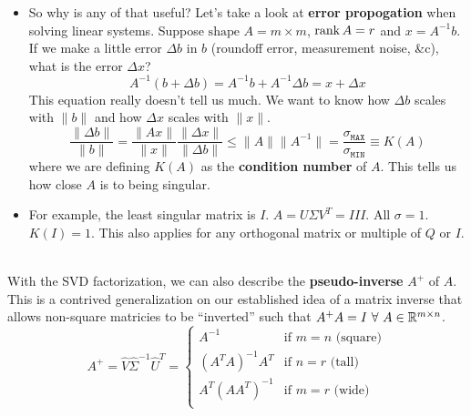 \documentclass[11pt]{article}
\begin{document}
\begin{itemize}
	\item So why is any of that useful? Let's take a look at \textbf{error propogation} when solving linear systems. Suppose $\text{shape } A = m \times m$, $\rank A = r$ and $x = A^{-1}b.$ If we make a little error $\Delta b$ in $b$ (roundoff error, measurement noise, &c), what is the error $\Delta x$? 
		$$A^{-1}(b + \Delta b) = A^{-1}b + A^{-1}\Delta b = x + \Delta x$$
This equation really doesn't tell us much. We want to know how $\Delta b$ scales with $\|b\|$ and how $\Delta x$ scales with $\| x\|$.
$$\frac{\| \Delta b \|}{\| b \|} = \frac{\| Ax \|}{\| x \|} \frac{\| \Delta x\|}{\|\Delta b\|} \leq \| A \| \| A^{-1}\| = \frac{\sigma_{\texttt{MAX}}}{\sigma_{\texttt{MIN}}} \equiv K(A)$$
where we are defining $K(A)$ as the \textbf{condition number} of $A$. This tells us how close $A$ is to being singular.
	\item For example, the least singular matrix is $I$. $A = U \Sigma V^T = I I I $. All $\sigma=1$. $K(I) = 1$. This also applies for any orthogonal matrix or multiple of $Q$ or $I$.
\end{itemize}
		\begin{ideabox}\quad\\
			With the SVD factorization, we can also describe the \textbf{pseudo-inverse} $A^{+}$ of $A$. This is a contrived generalization on our established idea of a matrix inverse that allows non-square matricies to be ``inverted'' such that $A^{+}A = I \ \forall \ A \in \mathbb{R}^{m \times n}$.
			$$A^+ = \hat{V}\hat{\Sigma}^{-1}\hat{U}^T = \begin{cases}
			A^{-1} &\text{if } m=n \text{ (square)} \\
			(A^T A)^{-1}A^T &\text{if } n=r \text{ (tall)} \\
			A^T(A A^T)^{-1} &\text{if } m=r \text{ (wide)} \\
		\end{cases}$$
		    
		\end{ideabox}
\end{document}
